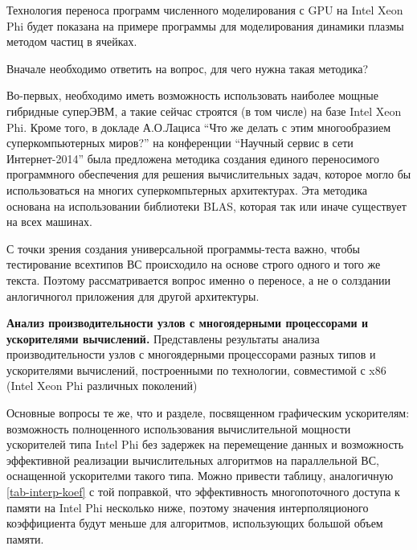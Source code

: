 
Технология переноса программ численного моделирования с GPU на Intel Xeon Phi
будет показана на примере программы для моделирования динамики плазмы методом частиц в ячейках.

Вначале необходимо ответить на вопрос, для чего нужна такая методика?

Во-первых, необходимо иметь возможность использовать наиболее мощные гибридные суперЭВМ, а такие сейчас строятся (в том числе) на базе Intel Xeon Phi. Кроме того, в
докладе А.О.Лациса “Что же делать с этим многообразием суперкомпьютерных миров?” на конференции “Научный сервис в сети Интернет-2014” \cite{Lacis2014} была предложена методика создания единого переносимого программного обеспечения для решения вычислительных задач, которое могло бы использоваться на многих суперкомпьтерных архитектурах. Эта методика основана на использовании библиотеки BLAS, которая так или иначе существует на всех машинах.


С точки зрения создания универсальной программы-теста важно, чтобы тестирование всехтипов ВС происходило на основе строго одного и того же текста. Поэтому рассматривается вопрос именно о переносе, а не о солздании анлогичногол приложения для другой архитектуры. 


\textbf{Анализ производительности узлов с многоядерными процессорами и ускорителями вычислений.} 
Представлены результаты анализа производительности узлов с многоядерными процессорами разных типов и ускорителями вычислений, построенными по технологии, совместимой с x86 (Intel Xeon Phi различных поколений)

Основные вопросы те же, что и разделе, посвященном графическим ускорителям: возможность полноценного использования вычислительной мощности 
ускорителей типа Intel Phi без задержек на перемещение данных и возможность эффективной реализации вычислительных алгоритмов на параллельной ВС, оснащенной ускорителми такого типа. Можно привести таблицу, аналогичную \ref{tab-interp-koef} с той поправкой, что эффективность многопоточного доступа к памяти на Intel Phi несколько ниже, поэтому значения интерполяционого коэффициента будут меньше для алгоритмов, использующих большой объем памяти.


